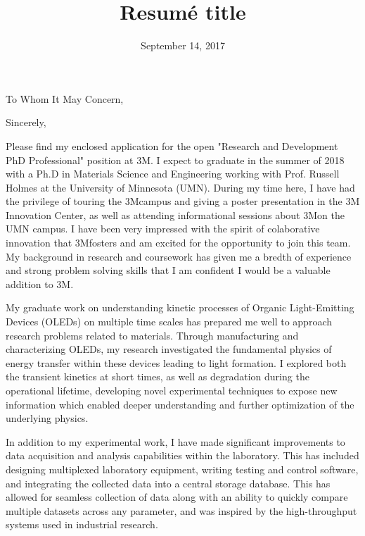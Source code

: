 \documentclass[11pt,a4paper,roman]{moderncv}        %
\title{Resumé title}                               %
\newcommand{\company}{3M}
\newcommand{\shortcompany}{3M}
\begin{document}
\date{September 14, 2017}
\opening{To Whom It May Concern,}
\closing{Sincerely,}
\makelettertitle
\justify
Please find my enclosed application for the open "Research and Development PhD Professional" position at \company.
I expect to graduate in the summer of 2018 with a  Ph.D in Materials Science and Engineering working with Prof. Russell Holmes at the University of Minnesota (UMN).
During my time here, I have had the privilege of touring the \shortcompany campus and giving a poster presentation in the 3M Innovation Center, as well as attending informational sessions about \company on the UMN campus.
I have been very impressed with the spirit of colaborative innovation that \company fosters and am excited for the opportunity to join this team.
My background in research and coursework has given me a bredth of experience and strong problem solving skills that I am confident I would be a valuable addition to \company.

My graduate work on understanding kinetic processes of Organic Light-Emitting Devices (OLEDs) on multiple time scales has prepared me well to approach research problems related to materials.
Through manufacturing and characterizing OLEDs, my research investigated the fundamental physics of energy transfer within these devices leading to light formation.
I explored both the transient kinetics at short times, as well as degradation during the operational lifetime, developing novel experimental techniques to expose new information which enabled deeper understanding and further optimization of the underlying physics. 

In addition to my experimental work, I have made significant improvements to data acquisition and analysis capabilities within the laboratory.
This has included designing multiplexed laboratory equipment, writing testing and control software, and integrating the collected data into a central storage database.
This has allowed for seamless collection of data along with an ability to quickly compare multiple datasets across any parameter, and was inspired by the high-throughput systems used in industrial research.  
\end{document}
